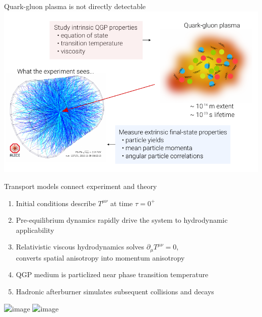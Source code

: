 \documentclass{beamer}
\begin{document}
\begin{frame}{Quark-gluon plasma is not directly detectable}
    \medskip
    \centering
    \includegraphics[height=0.8\textheight]{qgp_modeling}
\end{frame}


\begin{frame}[plain,t]{Transport models connect experiment and theory}
  \vspace{.075\textheight}
  \begin{enumerate}
    \small
  \item Initial conditions describe $T^{\mu\nu}$ at time $\tau=0^+$
    \item Pre-equilibrium dynamics rapidly drive the system to hydrodynamic applicability
    \item Relativistic viscous hydrodynamics solves $\partial_\mu T^{\mu\nu}=0$,\\
      converts spatial anisotropy into momentum anisotropy
    \item QGP medium is particlized near phase transition temperature
    \item Hadronic afterburner simulates subsequent collisions and decays
  \end{enumerate}
  \includegraphics<1>[width=\textwidth]{hic_picture1}
  \includegraphics<2>[width=\textwidth]{hic_picture3}
\end{frame}
\end{document}

